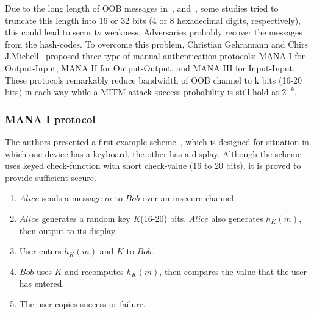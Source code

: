 Due to the long length of OOB messages in~\cite{1624021}, and~\cite{Smetters02talkingto}, some studies tried to truncate this length into 16 or 32 bits (4 or 8 hexadecimal digits, respectively), this could lead to security weakness. Adversaries probably recover the messages from the hash-codes. To overcome this problem, Christian Gehramann and Chirs J.Michell~\cite{Mitchell:2004p25948} proposed three type of manual authentication protocols: MANA I for Output-Input, MANA II for Output-Output, and MANA III for Input-Input. These protocols remarkably reduce bandwidth of OOB channel to k bits (16-20 bits) in each way while a MITM attack success probability is still hold at $2^{-k}$. 

\subsubsection*{MANA I protocol}

The authors presented a first example scheme~\cite{Mitchell:2004p25948}, which is designed for situation in which one device has a keyboard, the other has a display. Although the scheme uses keyed check-function with short check-value (16 to 20 bits), it is proved to provide sufficient secure. 

\begin{enumerate}
\item $Alice$ sends a message $m$ to $Bob$ over an insecure channel. 
\item $Alice$ generates a random key $K$(16-20) bits. $Alice$ also generates $h_K(m)$, then output to its display.
\item User enters $h_K(m)$ and $K$ to $Bob$.
\item $Bob$ uses $K$ and recomputes $h_K(m)$, then compares the value that the user has entered.
\item The user copies success or failure. 
\end{enumerate}

\begin{center}
\end{center}

